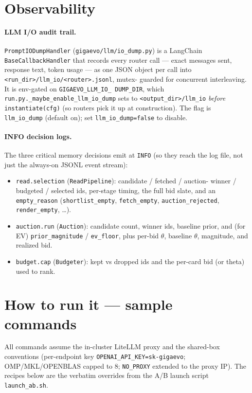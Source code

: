 \documentclass[11pt]{article}
\newcommand{\code}[1]{\texttt{#1}}
\begin{document}
\section{Observability}

\paragraph{LLM I/O audit trail.} \code{PromptIODumpHandler}
(\code{gigaevo/llm/io\_dump.py}) is a LangChain \code{BaseCallbackHandler} that
records every router call --- exact messages sent, response text, token usage ---
as one JSON object per call into \code{<run\_dir>/llm\_io/<router>.jsonl}, mutex-
guarded for concurrent interleaving. It is env-gated on \code{GIGAEVO\_LLM\_IO\_
DUMP\_DIR}, which \code{run.py.\_maybe\_enable\_llm\_io\_dump} sets to
\code{<output\_dir>/llm\_io} \emph{before} \code{instantiate(cfg)} (so routers
pick it up at construction). The flag is \code{llm\_io\_dump} (default on); set
\code{llm\_io\_dump=false} to disable.

\paragraph{INFO decision logs.} The three critical memory decisions emit at
\code{INFO} (so they reach the log file, not just the always-on JSONL event
stream):
\begin{itemize}[leftmargin=2em,itemsep=1pt]
\item \code{read.selection} (\code{ReadPipeline}): candidate / fetched / auction-
winner / budgeted / selected ids, per-stage timing, the full bid slate, and an
\code{empty\_reason} (\code{shortlist\_empty}, \code{fetch\_empty},
\code{auction\_rejected}, \code{render\_empty}, \ldots).
\item \code{auction.run} (\code{Auction}): candidate count, winner ids, baseline
prior, and (for EV) \code{prior\_magnitude} / \code{ev\_floor}, plus per-bid
$\theta$, baseline $\theta$, magnitude, and realized bid.
\item \code{budget.cap} (\code{Budgeter}): kept vs dropped ids and the per-card
bid (or theta) used to rank.
\end{itemize}

\section{How to run it --- sample commands}

All commands assume the in-cluster LiteLLM proxy and the shared-box conventions
(per-endpoint key \code{OPENAI\_API\_KEY=sk-gigaevo}; OMP/MKL/OPENBLAS capped to
8; \code{NO\_PROXY} extended to the proxy IP). The recipes below are the verbatim
overrides from the A/B launch script \code{launch\_ab.sh}.
\end{document}
